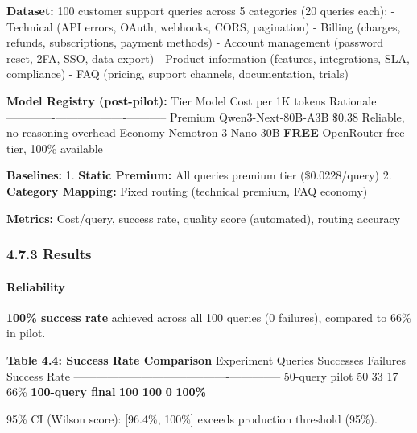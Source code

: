 \textbf{Dataset:} 100 customer support queries across 5 categories (20
queries each): - Technical (API errors, OAuth, webhooks, CORS,
pagination) - Billing (charges, refunds, subscriptions, payment methods)
- Account management (password reset, 2FA, SSO, data export) - Product
information (features, integrations, SLA, compliance) - FAQ (pricing,
support channels, documentation, trials)

\textbf{Model Registry (post-pilot):} \textbar{} Tier \textbar{} Model
\textbar{} Cost per 1K tokens \textbar{} Rationale \textbar{}
\textbar------\textbar-------\textbar-------------------\textbar-----------\textbar{}
\textbar{} Premium \textbar{} Qwen3-Next-80B-A3B \textbar{} \$0.38
\textbar{} Reliable, no reasoning overhead \textbar{} \textbar{} Economy
\textbar{} Nemotron-3-Nano-30B \textbar{} \textbf{FREE} \textbar{}
OpenRouter free tier, 100\% available \textbar{}

\textbf{Baselines:} 1. \textbf{Static Premium:} All queries premium tier
(\$0.0228/query) 2. \textbf{Category Mapping:} Fixed routing (technical
premium, FAQ economy)

\textbf{Metrics:} Cost/query, success rate, quality score (automated),
routing accuracy

\hypertarget{results-2}{%
\subsubsection{4.7.3 Results}\label{results-2}}

\hypertarget{reliability}{%
\paragraph{Reliability}\label{reliability}}

\textbf{100\% success rate} achieved across all 100 queries (0
failures), compared to 66\% in pilot.

\textbf{Table 4.4: Success Rate Comparison} \textbar{} Experiment
\textbar{} Queries \textbar{} Successes \textbar{} Failures \textbar{}
Success Rate \textbar{}
\textbar------------\textbar---------\textbar-----------\textbar----------\textbar--------------\textbar{}
\textbar{} 50-query pilot \textbar{} 50 \textbar{} 33 \textbar{} 17
\textbar{} 66\% \textbar{} \textbar{} \textbf{100-query final}
\textbar{} \textbf{100} \textbar{} \textbf{100} \textbar{} \textbf{0}
\textbar{} \textbf{100\%} \textbar{}

95\% CI (Wilson score): {[}96.4\%, 100\%{]} exceeds production threshold
(95\%).

